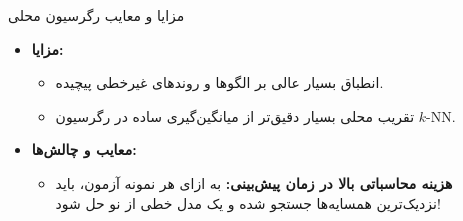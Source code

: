 \begin{frame}{مزایا و معایب رگرسیون محلی}{}
  \begin{itemize}
    \setlength{\itemsep}{6pt}
    \item \textbf{مزایا:}
    \begin{itemize}
      \setlength{\itemsep}{4pt}
      \item انطباق بسیار عالی بر الگوها و روندهای غیرخطی پیچیده.
      \item تقریب محلی بسیار دقیق‌تر از میانگین‌گیری ساده در رگرسیون $k$-NN.
    \end{itemize}
    \item \textbf{معایب و چالش‌ها:}
    \begin{itemize}
      \setlength{\itemsep}{4pt}
      \item \textbf{هزینه محاسباتی بالا در زمان پیش‌بینی:} 
      به ازای هر نمونه آزمون، باید نزدیک‌ترین همسایه‌ها جستجو شده و یک مدل خطی از نو حل شود!
    \end{itemize}
  \end{itemize}
\end{frame}

